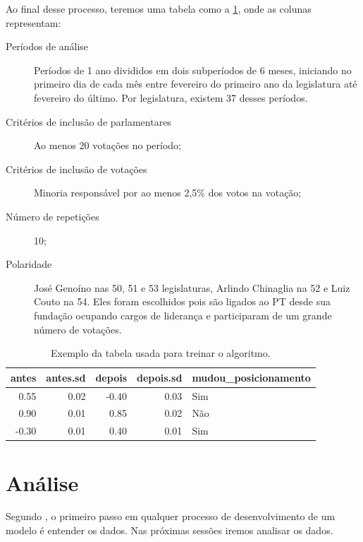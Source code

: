 \documentclass[a4paper,titlepage]{ppgi}\usepackage[]{graphicx}\usepackage[]{color}
\newenvironment{knitrout}{}{} %
\begin{document}
Ao final desse processo, teremos uma
tabela como a \ref{table:dataset-final}, onde as colunas representam:

\begin{description}
\item[Períodos de análise] Períodos de 1 ano divididos em dois
subperíodos de 6 meses, iniciando no primeiro dia de cada mês entre fevereiro
do primeiro ano da legislatura até fevereiro do último. Por legislatura,
existem 37 desses períodos.
\item[Critérios de inclusão de parlamentares] Ao menos 20 votações no período;
\item[Critérios de inclusão de votações] Minoria responsável por ao menos 2,5\%
dos votos na votação;
\item[Número de repetições] 10;
\item[Polaridade] José Genoíno nas 50\textordfeminine{}, 51\textordfeminine{} e
53\textordfeminine{} legislaturas, Arlindo Chinaglia na 52\textordfeminine{} e
Luiz Couto na 54\textordfeminine{}. Eles foram escolhidos pois são ligados ao
PT desde sua fundação ocupando cargos de liderança e participaram de um grande
número de votações.
\end{description}

\begin{table}
\centering
\begin{knitrout}
\color{fgcolor}
\begin{tabular}{r|r|r|r|l}
\hline
antes & antes.sd & depois & depois.sd & mudou\_posicionamento\\
\hline
0.55 & 0.02 & -0.40 & 0.03 & Sim\\
\hline
0.90 & 0.01 & 0.85 & 0.02 & Não\\
\hline
-0.30 & 0.01 & 0.40 & 0.01 & Sim\\
\hline
\end{tabular}


\end{knitrout}
\caption{Exemplo da tabela usada para treinar o algoritmo.}
\label{table:dataset-final}
\end{table}


\section{Análise}
\label{sec:miolo:analise}

Segundo , o primeiro passo em qualquer processo de
desenvolvimento de um modelo é entender os dados. Nas próximas sessões iremos
analisar os dados.
\end{document}
